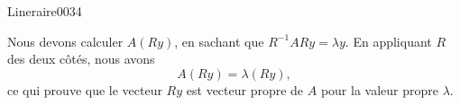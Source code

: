 \begin{corrige}{Lineraire0034}

	Nous devons calculer $A(Ry)$, en sachant que $R^{-1}ARy=\lambda y$. En appliquant $R$ des deux côtés, nous avons
	\begin{equation}
		A(Ry)=\lambda (Ry),
	\end{equation}
	 ce qui prouve que le vecteur $Ry$ est vecteur propre de $A$ pour la valeur propre $\lambda$.

\end{corrige}
